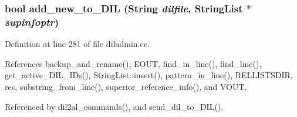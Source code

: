 \subsubsection{\setlength{\rightskip}{0pt plus 5cm}bool add\_\-new\_\-to\_\-DIL ({\bf String} {\em dilfile}, {\bf String\-List} $\ast$ {\em supinfoptr})}\label{dil2al_8hh_a298}




Definition at line 281 of file diladmin.cc.

References backup\_\-and\_\-rename(), EOUT, find\_\-in\_\-line(), find\_\-line(), get\_\-active\_\-DIL\_\-IDs(), String\-List::insert(), pattern\_\-in\_\-line(), RELLISTSDIR, res, substring\_\-from\_\-line(), superior\_\-reference\_\-info(), and VOUT.

Referenced by dil2al\_\-commands(), and send\_\-dil\_\-to\_\-DIL().



